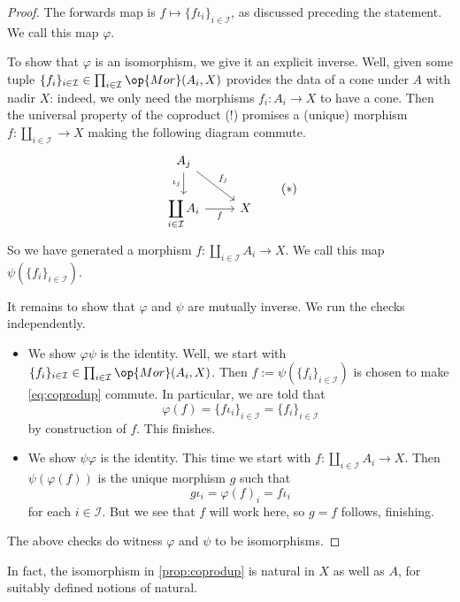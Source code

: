 \begin{proof}
	The forwards map is $f\mapsto\{f\iota_i\}_{i\in\mathcal I}$, as discussed preceding the statement. We call this map $\varphi$.

	To show that $\varphi$ is an isomorphism, we give it an explicit inverse. Well, given some tuple $\{f_i\}_{i\in\mathcal I}\in\prod_{i\in\mathcal I}\op{Mor}(A_i,X)$ provides the data of a cone under $A$ with nadir $X$: indeed, we only need the morphisms $f_i:A_i\to X$ to have a cone. Then the universal property of the coproduct (!) promises a (unique) morphism $f:\coprod_{i\in\mathcal I}\to X$ making the following diagram commute.
	\[\begin{tikzcd}
		{A_j} \\
		{\displaystyle\coprod_{i\in\mathcal I}A_i} & X
		\arrow["{\iota_j}"', from=1-1, to=2-1]
		\arrow["{f_j}", from=1-1, to=2-2]
		\arrow["f"', from=2-1, to=2-2]
	\end{tikzcd}\tag{$*$}\label{eq:coprodup}\]
	So we have generated a morphism $f:\coprod_{i\in\mathcal I}A_i\to X$. We call this map $\psi\left(\{f_i\}_{i\in\mathcal I}\right)$.

	It remains to show that $\varphi$ and $\psi$ are mutually inverse. We run the checks independently.
	\begin{itemize}
		\item We show $\varphi\psi$ is the identity. Well, we start with $\{f_i\}_{i\in\mathcal I}\in\prod_{i\in\mathcal I}\op{Mor}(A_i,X)$. Then $f:=\psi\left(\{f_i\}_{i\in\mathcal I}\right)$ is chosen to make \autoref{eq:coprodup} commute. In particular, we are told that
		\[\varphi(f)=\{f\iota_i\}_{i\in\mathcal I}=\{f_i\}_{i\in\mathcal I}\]
		by construction of $f$. This finishes.
		\item We show $\psi\varphi$ is the identity. This time we start with $f:\coprod_{i\in\mathcal I}A_i\to X$. Then $\psi(\varphi(f))$ is the unique morphism $g$ such that
		\[g\iota_i=\varphi(f)_i=f\iota_i\]
		for each $i\in\mathcal I$. But we see that $f$ will work here, so $g=f$ follows, finishing.
	\end{itemize}
	The above checks do witness $\varphi$ and $\psi$ to be isomorphisms.
\end{proof}
\begin{remark}
	In fact, the isomorphism in \autoref{prop:coprodup} is natural in $X$ as well as $A$, for suitably defined notions of natural.
\end{remark}
